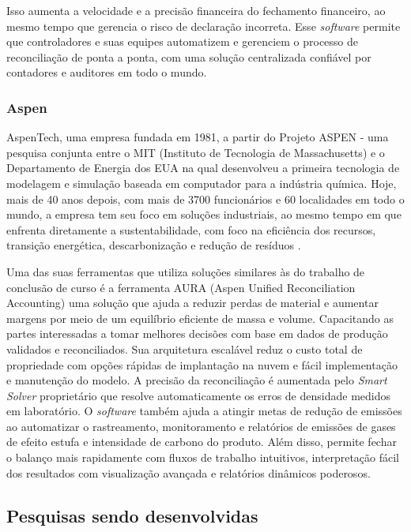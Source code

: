 Isso aumenta a velocidade e a precisão financeira do fechamento financeiro, ao mesmo tempo que gerencia o risco de declaração incorreta. Esse \textit{software} permite que controladores e suas equipes automatizem e gerenciem o processo de reconciliação de ponta a ponta, com uma solução centralizada confiável por contadores e auditores em todo o mundo.

\subsubsection{Aspen}

AspenTech, uma empresa fundada em 1981, a partir do Projeto ASPEN - uma pesquisa conjunta entre o MIT (Instituto de Tecnologia de Massachusetts) e o Departamento de Energia dos EUA na qual desenvolveu a primeira tecnologia de modelagem e simulação baseada em computador para a indústria química. Hoje, mais de 40 anos depois, com mais de 3700 funcionários e 60 localidades em todo o mundo, a empresa tem seu foco em soluções industriais, ao mesmo tempo em que enfrenta diretamente a sustentabilidade, com foco na eficiência dos recursos, transição energética, descarbonização e redução de resíduos \cite{aspen}.

Uma das suas ferramentas que utiliza soluções similares às do trabalho de conclusão de curso é a ferramenta AURA (Aspen Unified Reconciliation Accounting) uma solução que ajuda a reduzir perdas de material e aumentar margens por meio de um equilíbrio eficiente de massa e volume. Capacitando as partes interessadas a tomar melhores decisões com base em dados de produção validados e reconciliados. Sua arquitetura escalável reduz o custo total de propriedade com opções rápidas de implantação na nuvem e fácil implementação e manutenção do modelo. A precisão da reconciliação é aumentada pelo \textit{Smart Solver} proprietário que resolve automaticamente os erros de densidade medidos em laboratório. O \textit{software} também ajuda a atingir metas de redução de emissões ao automatizar o rastreamento, monitoramento e relatórios de emissões de gases de efeito estufa e intensidade de carbono do produto. Além disso, permite fechar o balanço mais rapidamente com fluxos de trabalho intuitivos, interpretação fácil dos resultados com visualização avançada e relatórios dinâmicos poderosos.



\subsection{Pesquisas sendo desenvolvidas}

